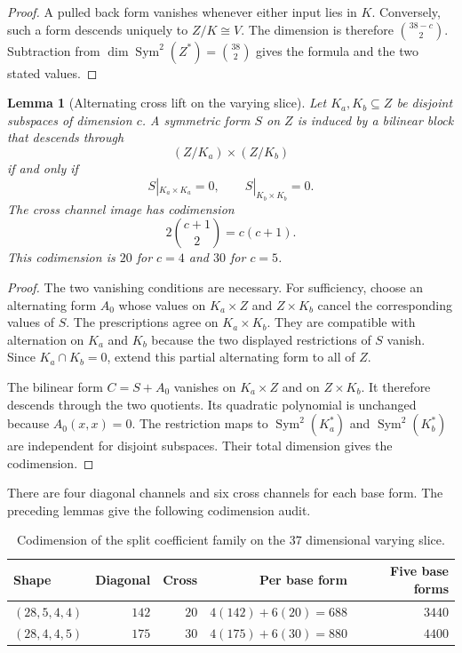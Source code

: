 \documentclass[11pt]{article}
\newcommand{\Sym}{\operatorname{Sym}}
\theoremstyle{plain}
\newtheorem{lemma}[theorem]{Lemma}
\theoremstyle{definition}
\theoremstyle{remark}
\begin{document}
\begin{proof}
A pulled back form vanishes whenever either input lies in $K$.  Conversely,
such a form descends uniquely to $Z/K\cong V$.  The dimension is therefore
$\binom{38-c}{2}$.  Subtraction from
$\dim\Sym^2(Z^*)=\binom{38}{2}$ gives the formula and the two stated values.
\end{proof}

\begin{lemma}[Alternating cross lift on the varying slice]
\label{lem:l4-cross-lift}
Let $K_a,K_b\subseteq Z$ be disjoint subspaces of dimension $c$.  A
symmetric form $S$ on $Z$ is induced by a bilinear block that descends
through
\[
  (Z/K_a)\times(Z/K_b)
\]
if and only if
\[
  S|_{K_a\times K_a}=0,
  \qquad S|_{K_b\times K_b}=0.
\]
The cross channel image has codimension
\[
  2\binom{c+1}{2}=c(c+1).
\]
This codimension is $20$ for $c=4$ and $30$ for $c=5$.
\end{lemma}

\begin{proof}
The two vanishing conditions are necessary.  For sufficiency, choose an
alternating form $A_0$ whose values on $K_a\times Z$ and $Z\times K_b$
cancel the corresponding values of $S$.  The prescriptions agree on
$K_a\times K_b$.  They are compatible with alternation on $K_a$ and $K_b$
because the two displayed restrictions of $S$ vanish.  Since
$K_a\cap K_b=0$, extend this partial alternating form to all of $Z$.

The bilinear form $C=S+A_0$ vanishes on $K_a\times Z$ and on
$Z\times K_b$.  It therefore descends through the two quotients.  Its
quadratic polynomial is unchanged because $A_0(x,x)=0$.  The restriction
maps to $\Sym^2(K_a^*)$ and $\Sym^2(K_b^*)$ are independent for disjoint
subspaces.  Their total dimension gives the codimension.
\end{proof}

There are four diagonal channels and six cross channels for each base form.
The preceding lemmas give the following codimension audit.

\begin{table}[h]
\centering
\caption{Codimension of the split coefficient family on the $37$ dimensional
varying slice.}
\label{tab:l4-codim}
\begin{tabular}{@{}lrrrr@{}}
\toprule
Shape & Diagonal & Cross & Per base form & Five base forms\\
\midrule
$(28,5,4,4)$ & $142$ & $20$ & $4(142)+6(20)=688$ & $3440$\\
$(28,4,4,5)$ & $175$ & $30$ & $4(175)+6(30)=880$ & $4400$\\
\bottomrule
\end{tabular}
\end{table}
\end{document}
